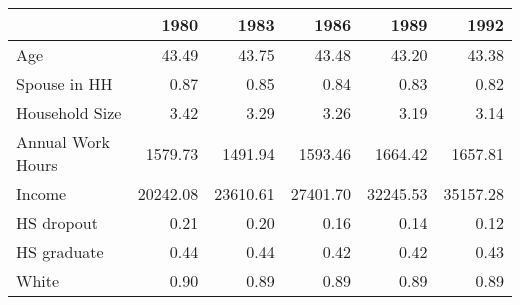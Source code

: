 \begin{tabular}{lrrrrr}
\toprule
{} &      1980 &      1983 &      1986 &      1989 &      1992 \\
\midrule
Age               &     43.49 &     43.75 &     43.48 &     43.20 &     43.38 \\
Spouse in HH      &      0.87 &      0.85 &      0.84 &      0.83 &      0.82 \\
Household Size    &      3.42 &      3.29 &      3.26 &      3.19 &      3.14 \\
Annual Work Hours &   1579.73 &   1491.94 &   1593.46 &   1664.42 &   1657.81 \\
Income            &  20242.08 &  23610.61 &  27401.70 &  32245.53 &  35157.28 \\
HS dropout        &      0.21 &      0.20 &      0.16 &      0.14 &      0.12 \\
HS graduate       &      0.44 &      0.44 &      0.42 &      0.42 &      0.43 \\
White             &      0.90 &      0.89 &      0.89 &      0.89 &      0.89 \\
\bottomrule
\end{tabular}
